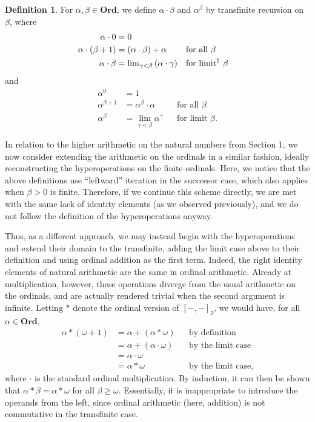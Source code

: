 \documentclass[12pt, a4paper]{article}
\theoremstyle{definition}
\newtheorem{definition}[theorem]{Definition}
\theoremstyle{remark}
\newcommand{\ord}{\mathbf{Ord}}
\begin{document}
\begin{definition}
    For $\alpha, \beta\in\ord$, we define $\alpha\cdot\beta$ and $\alpha^\beta$ by transfinite recursion on $\beta$, where
    \begin{align*}
        \alpha \cdot 0 &= 0\\
        \alpha \cdot (\beta+1) &= (\alpha\cdot\beta) + \alpha && \text{for all }\beta\\
        \alpha \cdot \beta &= \textstyle\lim_{\gamma < \beta} {(\alpha\cdot\gamma)} &&\text{for limit\footnotemark}\ \beta
    \end{align*}
    and
        \begin{align*}
        \alpha^0 &= 1\\
        \alpha^{\beta+1} &= \alpha^\beta \cdot \alpha && \text{for all }\beta\\
        \alpha^\beta &= \textstyle\lim_{\gamma < \beta} \alpha^\gamma &&\text{for limit }\beta.
    \end{align*}
\end{definition}


In relation to the higher arithmetic on the natural numbers from Section 1, we now consider extending the arithmetic on the ordinals in a similar fashion, ideally reconstructing the hyperoperations on the finite ordinals. Here, we notice that the above definitions use ``leftward'' iteration in the successor case, which also applies when $\beta > 0$ is finite. Therefore, if we continue this scheme directly, we are met with the same lack of identity elements (as we observed previously), and we do not follow the definition of the hyperoperations anyway.

Thus, as a different approach, we may instead begin with the hyperoperations and extend their domain to the transfinite, adding the limit case above to their definition and using ordinal addition as the first term. Indeed, the right identity elements of natural arithmetic are the same in ordinal arithmetic. Already at multiplication, however, these operations diverge from the usual arithmetic on the ordinals, and are actually rendered trivial when the second argument is infinite. Letting $*$ denote the ordinal version of $[-,-]_2$, we would have, for all $\alpha \in \ord$,
\begin{align*}
    \alpha * (\omega + 1) &= \alpha + (\alpha * \omega) && \text{by definition} \\
                          &= \alpha + (\alpha \cdot \omega) && \text{by the limit case} \\
                          &= \alpha \cdot \omega && \\
                          &= \alpha * \omega && \text{by the limit case,}
\end{align*}
where $\cdot$ is the standard ordinal multiplication. By induction, it can then be shown that $\alpha * \beta = \alpha * \omega$ for all $\beta\geq\omega$. Essentially, it is inappropriate to introduce the operands from the left, since ordinal arithmetic (here, addition) is not commutative in the transfinite case.
\end{document}
